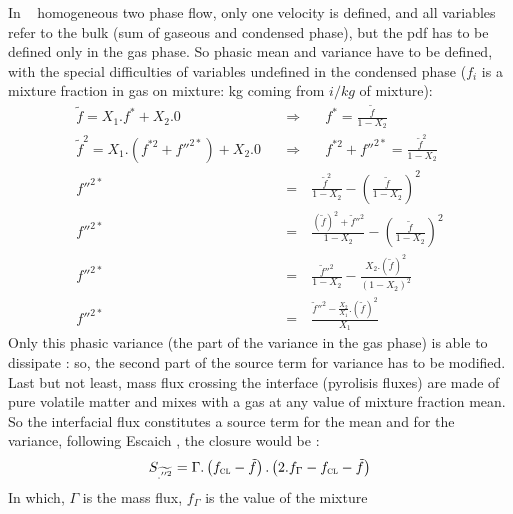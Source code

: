In \CS~ homogeneous two phase flow, only one velocity is defined, and all
variables refer to the bulk (sum of gaseous and condensed phase), but the pdf
has to be defined only in the gas phase. So phasic mean and variance have to be
defined, with the special difficulties of variables undefined in the condensed
phase ($f_i$ is a mixture fraction in gas on mixture: kg coming from $i / kg$ of
mixture):
\begin{eqnarray}
\widetilde{f} = X_{1}.f^{*} + X_{2}.0 \quad &\Rightarrow& \quad f^{*} = \frac{\tilde f}{1-X_{2}}                        \label{Eqs_var_001}\\
\widetilde{f}^{2} = X_{1}.\left( f^{*2} + f''^{2*} \right)+ X_{2}.0 \quad &\Rightarrow& \quad f^{*2} + f''^{2*} = \frac{\widetilde f^{2}}{1-X_{2}}                                                                                                                                          \label{Eqs_va_002} \\
f''^{2*} &=& \frac{\widetilde f^{2}}{1-X_{2}} - \left( \frac{\tilde f}{1-X_{2}}\right)^{\textstyle 2}                   \label{Eqs_var_003}\\
f''^{2*} &=& \frac{(\tilde f)^{2} + \widetilde f''^{2}}{1-X_{2}} - \left( \frac{\tilde f}{1-X_{2}}\right)^{\textstyle2} \label{Eqs_var_004}\\
f''^{2*} &=& \frac{\widetilde f''^{2}}{1-X_{2}} -  \frac{X_{2}.(\tilde f)^{2}}{(1-X_{2})^{2}}                           \label{Eqs_var_005}\\
f''^{2*} &=& \frac{\widetilde f''^{2} - \frac{X_{2}}{X_{1}}.(\tilde f)^{2} }{X_{1}}                                     \label{Eqs_var_006}
\end{eqnarray}
Only this phasic variance (the part of the variance in the gas phase)
is able to dissipate : so, the second part of the source term for variance has
to be modified.\\
Last but not least, mass flux crossing the interface (pyrolisis fluxes) are made
of pure volatile matter and mixes with a gas at any value of mixture fraction
mean. So the interfacial flux constitutes a source term for the mean and for the
variance, following Escaich \cite{1}, the closure would be :
\begin{equation}
\displaystyle S_{\widetilde{.''^2}} = \Gamma . \left( f_{\mbox{\scriptsize\textsc{cl}}} -\tilde f \right) . \left( 2.f_{\Gamma} - f_{\mbox{\scriptsize\textsc{cl}}} - \tilde f \right)
\end{equation}
In which, $\Gamma$ is the mass flux, $f_{\Gamma}$ is the value of the mixture
